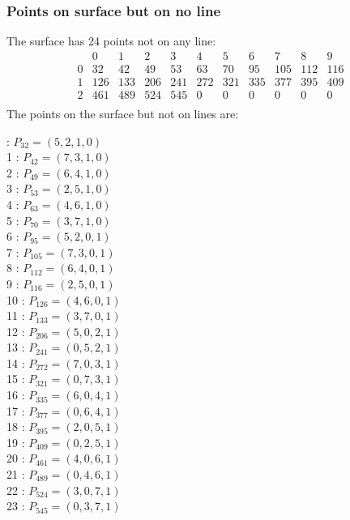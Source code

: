 \documentclass{article}
\begin{document}
{\subsubsection*{Points on surface but on no line}
The surface has 24 points not on any line:\\
$$
\begin{array}{r|*{10}{r}}
 & 0 & 1 & 2 & 3 & 4 & 5 & 6 & 7 & 8 & 9\\
\hline
0 & 32 & 42 & 49 & 53 & 63 & 70 & 95 & 105 & 112 & 116\\
1 & 126 & 133 & 206 & 241 & 272 & 321 & 335 & 377 & 395 & 409\\
2 & 461 & 489 & 524 & 545 & 0 & 0 & 0 & 0 & 0 & 0\\
\end{array}
$$
The points on the surface but not on lines are:\\
\begin{multicols}{2}
 : $P_{32}=( 5, 2, 1, 0 )$\\
1 : $P_{42}=( 7, 3, 1, 0 )$\\
2 : $P_{49}=( 6, 4, 1, 0 )$\\
3 : $P_{53}=( 2, 5, 1, 0 )$\\
4 : $P_{63}=( 4, 6, 1, 0 )$\\
5 : $P_{70}=( 3, 7, 1, 0 )$\\
6 : $P_{95}=( 5, 2, 0, 1 )$\\
7 : $P_{105}=( 7, 3, 0, 1 )$\\
8 : $P_{112}=( 6, 4, 0, 1 )$\\
9 : $P_{116}=( 2, 5, 0, 1 )$\\
10 : $P_{126}=( 4, 6, 0, 1 )$\\
11 : $P_{133}=( 3, 7, 0, 1 )$\\
12 : $P_{206}=( 5, 0, 2, 1 )$\\
13 : $P_{241}=( 0, 5, 2, 1 )$\\
14 : $P_{272}=( 7, 0, 3, 1 )$\\
15 : $P_{321}=( 0, 7, 3, 1 )$\\
16 : $P_{335}=( 6, 0, 4, 1 )$\\
17 : $P_{377}=( 0, 6, 4, 1 )$\\
18 : $P_{395}=( 2, 0, 5, 1 )$\\
19 : $P_{409}=( 0, 2, 5, 1 )$\\
20 : $P_{461}=( 4, 0, 6, 1 )$\\
21 : $P_{489}=( 0, 4, 6, 1 )$\\
22 : $P_{524}=( 3, 0, 7, 1 )$\\
23 : $P_{545}=( 0, 3, 7, 1 )$\\
\end{multicols}
}
\end{document}
